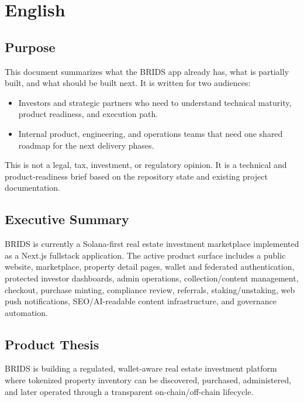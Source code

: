 \documentclass[
  10pt,
  letterpaper,
]{article}
\providecommand{\tightlist}{%
  \setlength{\itemsep}{0pt}\setlength{\parskip}{0pt}}
\begin{document}
\section{English}\label{english}

\subsection{Purpose}\label{purpose}

This document summarizes what the BRIDS app already has, what is
partially built, and what should be built next. It is written for two
audiences:

\begin{itemize}
\tightlist
\item
  Investors and strategic partners who need to understand technical
  maturity, product readiness, and execution path.
\item
  Internal product, engineering, and operations teams that need one
  shared roadmap for the next delivery phases.
\end{itemize}

This is not a legal, tax, investment, or regulatory opinion. It is a
technical and product-readiness brief based on the repository state and
existing project documentation.

\subsection{Executive Summary}\label{executive-summary}

BRIDS is currently a Solana-first real estate investment marketplace
implemented as a Next.js fullstack application. The active product
surface includes a public website, marketplace, property detail pages,
wallet and federated authentication, protected investor dashboards,
admin operations, collection/content management, checkout, purchase
minting, compliance review, referrals, staking/unstaking, web push
notifications, SEO/AI-readable content infrastructure, and governance
automation.

\subsection{Product Thesis}\label{product-thesis}

BRIDS is building a regulated, wallet-aware real estate investment
platform where tokenized property inventory can be discovered,
purchased, administered, and later operated through a transparent
on-chain/off-chain lifecycle.
\end{document}
